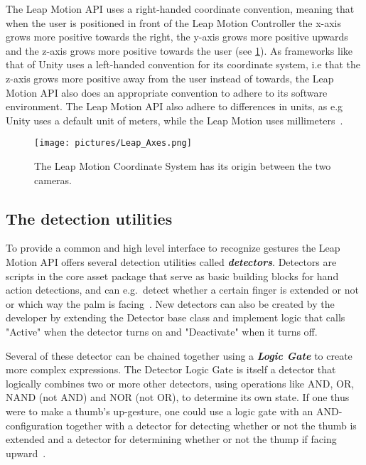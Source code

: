 The Leap Motion API uses a right-handed coordinate convention, meaning that when the user is positioned in front of the Leap Motion Controller the x-axis grows more positive 
towards the right, the y-axis grows more positive upwards and the z-axis grows more positive towards the user (see \ref{fig:leapmotion3}). 
As frameworks like that of Unity uses a left-handed convention for its coordinate system, i.e that the z-axis grows more positive away from the 
user instead of towards, the Leap Motion API also does an appropriate convention to adhere to its software environment. 
The Leap Motion API also adhere to differences in units, as e.g Unity uses a default unit of meters, while the Leap Motion uses millimeters~\citep{LeapMotion2016}.

\begin{figure}%
	\texttt{[image: pictures/Leap\_Axes.png]}
	\caption[Leap Motion Coordinates]{The Leap Motion Coordinate System has its origin between the two cameras.}
	\label{fig:leapmotion3}
\end{figure} 

\subsection{The detection utilities}
To provide a common and high level interface to recognize gestures the Leap Motion API offers several detection utilities called \textbf{\textit{detectors}}.
Detectors are scripts in the core asset package that serve as basic building blocks for hand action detections, and can e.g.~detect whether a certain finger is extended or not
or which way the palm is facing~\citep{LeapMotion2016}. New detectors can also be created by the developer by extending
the Detector base class and implement logic that calls "Active" when the detector turns on and "Deactivate" when it turns off.

Several of these detector can be chained together using a \textbf{\textit{Logic Gate}} to create more complex expressions. 
The Detector Logic Gate is itself a detector that logically combines two or more other detectors, using operations like AND, OR, NAND (not AND) and NOR (not OR), 
to determine its own state.
If one thus were to make a thumb's up-gesture, one could use a logic gate with an AND-configuration together with a detector for detecting whether or not the
thumb is extended and a detector for determining whether or not the thump if facing upward~\citep{LeapMotion2016}. 

